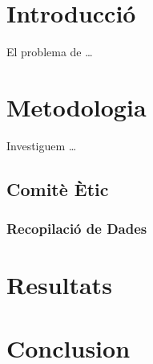\documentclass{article}
\begin{document}
\section{Introducció}

El problema de \dots

\section{Metodologia}

Investiguem \dots

\subsection{Comitè Ètic}
\subsubsection{Recopilació de Dades}

\section{Resultats}

\section{Conclusion}
\end{document}
